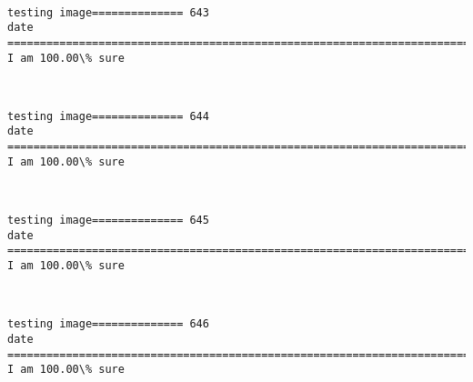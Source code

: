 \documentclass[11pt]{article}
\begin{document}
    \begin{center}
    \end{center}
    { \hspace*{\fill} \\}
    
    \begin{Verbatim}[commandchars=\\\{\}]
testing image============== 643
date
============================================================================
I am 100.00\% sure

    \end{Verbatim}

    \begin{center}
    \end{center}
    { \hspace*{\fill} \\}
    
    \begin{Verbatim}[commandchars=\\\{\}]
testing image============== 644
date
============================================================================
I am 100.00\% sure

    \end{Verbatim}

    \begin{center}
    \end{center}
    { \hspace*{\fill} \\}
    
    \begin{Verbatim}[commandchars=\\\{\}]
testing image============== 645
date
============================================================================
I am 100.00\% sure

    \end{Verbatim}

    \begin{center}
    \end{center}
    { \hspace*{\fill} \\}
    
    \begin{Verbatim}[commandchars=\\\{\}]
testing image============== 646
date
============================================================================
I am 100.00\% sure

    \end{Verbatim}
\end{document}
